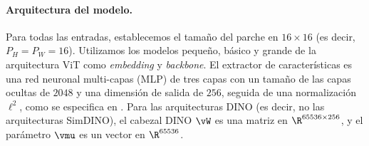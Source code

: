 \documentclass[../../book-main_es.tex]{subfiles}
\begin{document}
\paragraph{Arquitectura del modelo.} Para todas las entradas, establecemos el tamaño del parche
en \(16 \times 16\) (es decir, \(P_{H} = P_{W} = 16\)). Utilizamos los
modelos pequeño, básico y grande de la arquitectura ViT \citep{dosovitskiy2020image}
como \textit{embedding} y \textit{backbone}. El extractor de características es
una red neuronal multi-capas (MLP) de tres capas con un tamaño de las capas ocultas de \(2048\) y una dimensión de salida
de \(256\), seguida de una normalización \(\ell^{2}\), como
se especifica en . Para las arquitecturas DINO
(es decir, no las arquitecturas SimDINO), el cabezal DINO
\(\vW\) es una matriz en \(\R^{65536 \times 256}\), y el parámetro
\(\vmu\) es un vector en \(\R^{65536}\).
\end{document}
